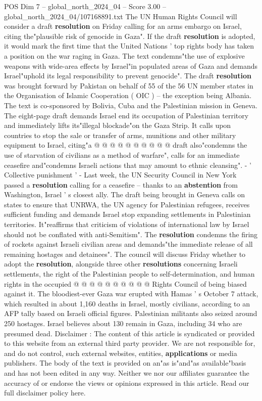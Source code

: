 \begin{textsample}{POS Dim 7 – global\_north\_2024\_04 – Score 3.00 – global\_north\_2024\_04/107168891.txt}  \label{ex:f7_pos_226}
The UN Human Rights Council will consider a draft \textbf{resolution} on Friday calling for an arms embargo on Israel, citing the"plausible risk of genocide in Gaza".
If the draft \textbf{resolution} is adopted, it would mark the first time that the United Nations ' top rights body has taken a position on the war raging in Gaza.
The text condemns"the use of explosive weapons with wide-area effects by Israel"in populated areas of Gaza and demands Israel"uphold its legal responsibility to prevent genocide".
The draft \textbf{resolution} was brought forward by Pakistan on behalf of 55 of the 56 UN member states in the Organisation of Islamic Cooperation ( OIC ) -- the exception being Albania.
The text is co-sponsored by Bolivia, Cuba and the Palestinian mission in Geneva.
The eight-page draft demands Israel end its occupation of Palestinian territory and immediately lifts its"illegal blockade"on the Gaza Strip.
It calls upon countries to stop the sale or transfer of arms, munitions and other military equipment to Israel, citing"a @ @ @ @ @ @ @ @ @ @ draft also"condemns the use of starvation of civilians as a method of warfare", calls for an immediate ceasefire and"condemns Israeli actions that may amount to ethnic cleansing". - ' Collective punishment ' - Last week, the UN Security Council in New York passed a \textbf{resolution} calling for a ceasefire -- thanks to an \textbf{abstention} from Washington, Israel ' s closest ally.
The draft being brought in Geneva calls on states to ensure that UNRWA, the UN agency for Palestinian refugees, receives sufficient funding and demands Israel stop expanding settlements in Palestinian territories.
It"reaffirms that criticism of violations of international law by Israel should not be conflated with anti-Semitism".
The \textbf{resolution} condemns the firing of rockets against Israeli civilian areas and demands"the immediate release of all remaining hostages and detainees".
The council will discuss Friday whether to adopt the \textbf{resolution}, alongside three other \textbf{resolutions} concerning Israeli settlements, the right of the Palestinian people to self-determination, and human rights in the occupied @ @ @ @ @ @ @ @ @ @ Rights Council of being biased against it.
The bloodiest-ever Gaza war erupted with Hamas ' s October 7 attack, which resulted in about 1,160 deaths in Israel, mostly civilians, according to an AFP tally based on Israeli official figures.
Palestinian militants also seized around 250 hostages.
Israel believes about 130 remain in Gaza, including 34 who are presumed dead.
Disclaimer : The content of this article is syndicated or provided to this website from an external third party provider.
We are not responsible for, and do not control, such external websites, entities, \textbf{applications} or media publishers.
The body of the text is provided on an"as is"and"as available"basis and has not been edited in any way.
Neither we nor our affiliates guarantee the accuracy of or endorse the views or opinions expressed in this article.
Read our full disclaimer policy here.

\end{textsample}
